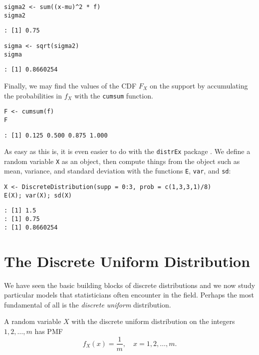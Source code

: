 \begin{verbatim}
sigma2 <- sum((x-mu)^2 * f)
sigma2
\end{verbatim}

\begin{verbatim}
: [1] 0.75
\end{verbatim}

\begin{verbatim}
sigma <- sqrt(sigma2)
sigma
\end{verbatim}

\begin{verbatim}
: [1] 0.8660254
\end{verbatim}

Finally, we may find the values of the CDF \(F_{X}\) on the support by
accumulating the probabilities in \(f_{X}\) with the \texttt{cumsum}
function.

\begin{verbatim}
F <- cumsum(f)
F
\end{verbatim}

\begin{verbatim}
: [1] 0.125 0.500 0.875 1.000
\end{verbatim}

As easy as this is, it is even easier to do with the \texttt{distrEx} package
\cite{distrEx}. We define a random variable \texttt{X} as an object, then
compute things from the object such as mean, variance, and standard
deviation with the functions \texttt{E}, \texttt{var}, and \texttt{sd}:

\begin{verbatim}
X <- DiscreteDistribution(supp = 0:3, prob = c(1,3,3,1)/8)
E(X); var(X); sd(X)
\end{verbatim}

\begin{verbatim}
: [1] 1.5
: [1] 0.75
: [1] 0.8660254
\end{verbatim}

\section{The Discrete Uniform Distribution}
\label{sec-5-2}

We have seen the basic building blocks of discrete distributions and
we now study particular models that statisticians often encounter in
the field. Perhaps the most fundamental of all is the \emph{discrete
uniform} distribution.

A random variable \(X\) with the discrete uniform distribution on the
integers \(1,2,\ldots,m\) has PMF
\begin{equation}
f_{X}(x)=\frac{1}{m},\quad x=1,2,\ldots,m.
\end{equation}

